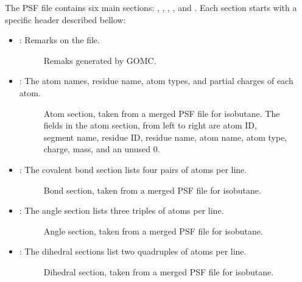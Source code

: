 \documentclass[letterpaper,10pt,english]{sphinxmanual}
\begin{document}
The PSF file contains six main sections: , , , , and .
Each section starts with a specific header described bellow:
\begin{itemize}
\item {} 
: Remarks on the file.

\begin{figure}[htbp]
\centering
\capstart

\noindent{}
\caption{Remaks generated by GOMC.}\label{\detokenize{output_file:id10}}\end{figure}

\item {} 
: The atom names, residue name, atom types, and partial charges of each atom.

\begin{figure}[htbp]
\centering
\capstart

\noindent{}
\caption{Atom section, taken from a merged PSF file for isobutane. The fields in the atom section,
from left to right are atom ID, segment name, residue ID, residue name, atom name, atom type,
charge, mass, and an unused 0.}\label{\detokenize{output_file:id11}}\end{figure}

\item {} 
: The covalent bond section lists four pairs of atoms per line.

\begin{figure}[htbp]
\centering
\capstart

\noindent{}
\caption{Bond section, taken from a merged PSF file for isobutane.}\label{\detokenize{output_file:id12}}\end{figure}

\item {} 
: The angle section lists three triples of atoms per line.

\begin{figure}[htbp]
\centering
\capstart

\noindent{}
\caption{Angle section, taken from a merged PSF file for isobutane.}\label{\detokenize{output_file:id13}}\end{figure}

\item {} 
: The dihedral sections list two quadruples of atoms per line.

\begin{figure}[htbp]
\centering
\capstart

\noindent{}
\caption{Dihedral section, taken from a merged PSF file for isobutane.}\label{\detokenize{output_file:id14}}\end{figure}

\end{itemize}
\end{document}
